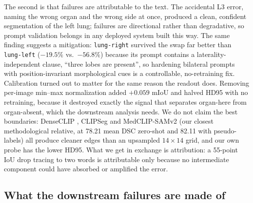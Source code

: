 \documentclass[10pt]{article}
\newcommand{\org}[1]{\texttt{#1}}
\begin{document}
The second is that failures are attributable to the text. The accidental L3 error,
naming the wrong organ and the wrong side at once, produced a clean, confident
segmentation of the left lung; failures are directional rather than degradative,
so prompt validation belongs in any deployed system built this way. The same
finding suggests a mitigation: \org{lung-right} survived the swap far better than
\org{lung-left} ($-19.5\%$ vs.\ $-56.8\%$) because its prompt contains a
laterality-independent clause, ``three lobes are present'', so hardening bilateral
prompts with position-invariant morphological cues is a controllable,
no-retraining fix. Calibration turned out to matter for the same reason the
readout does. Removing per-image min--max normalization added $+0.059$ mIoU and
halved HD95 with no retraining, because it destroyed exactly the signal that
separates organ-here from organ-absent, which the downstream analysis needs. We
do not claim the best boundaries: DenseCLIP \cite{rao2022denseclip}, CLIPSeg
\cite{lueddecke2022clipseg} and MedCLIP-SAMv2 \cite{koleilat2025medclipsamv2,
kirillov2023sam} (our closest methodological relative, at 78.21 mean DSC
zero-shot and 82.11 with pseudo-labels) all produce cleaner edges than an
upsampled $14\times14$ grid, and our own probe has the lower HD95. What we get in
exchange is attribution: a 55-point IoU drop tracing to two words is attributable
only because no intermediate component could have absorbed or amplified the error.

\subsection{What the downstream failures are made of}
\end{document}
